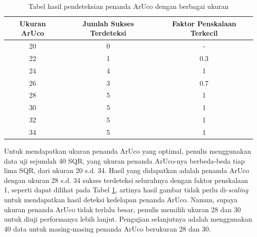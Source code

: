 \begin{table}[h]
	\caption{Tabel hasil pendeteksian penanda ArUco dengan berbagai ukuran}
	\vspace{0.5em}
	\centering
	\begin{tabular}{|c|c|c|}
		\hline
		\textbf{Ukuran ArUco} & \textbf{Jumlah Sukses Terdeteksi} & \textbf{Faktor Penskalaan Terkecil} \\
		\hline
		20                    & 0                                 & -                                   \\
		22                    & 1                                 & 0.3                                 \\
		24                    & 4                                 & 1                                   \\
		26                    & 3                                 & 0.7                                 \\
		28                    & 5                                 & 1                                   \\
		30                    & 5                                 & 1                                   \\
		32                    & 5                                 & 1                                   \\
		34                    & 5                                 & 1                                   \\ \hline
	\end{tabular}
	\label{Tab: 4-tabelhasildeteksiaruco}
\end{table}

Untuk mendapatkan ukuran penanda ArUco yang optimal, penulis menggunakan data uji sejumlah 40 SQR, yang ukuran penanda ArUco-nya berbeda-beda tiap lima SQR,
dari ukuran 20 s.d. 34. Hasil yang didapatkan adalah penanda ArUco dengan ukuran 28 s.d. 34 sukses terdeteksi seluruhnya dengan faktor penskalaan 1, seperti
dapat dilihat pada Tabel \ref{Tab: 4-tabelhasildeteksiaruco}, artinya hasil gambar tidak perlu di-\emph{scaling} untuk mendapatkan hasil deteksi kedelapan
penanda ArUco. Namun, supaya ukuran penanda ArUco tidak terlalu besar, penulis memilih ukuran 28 dan 30 untuk diuji performanya lebih lanjut. Pengujian
selanjutnya adalah menggunakan 40 data untuk masing-masing penanda ArUco berukuran 28 dan 30.


